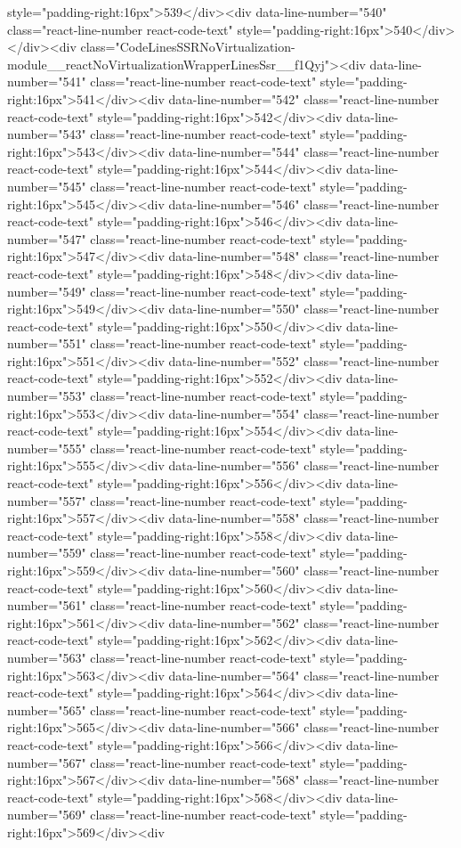 {{{{{{{style="padding-right:16px">539</div><div data-line-number="540" class="react-line-number react-code-text" style="padding-right:16px">540</div></div><div class="CodeLinesSSRNoVirtualization-module__reactNoVirtualizationWrapperLinesSsr__f1Qyj"><div data-line-number="541" class="react-line-number react-code-text" style="padding-right:16px">541</div><div data-line-number="542" class="react-line-number react-code-text" style="padding-right:16px">542</div><div data-line-number="543" class="react-line-number react-code-text" style="padding-right:16px">543</div><div data-line-number="544" class="react-line-number react-code-text" style="padding-right:16px">544</div><div data-line-number="545" class="react-line-number react-code-text" style="padding-right:16px">545</div><div data-line-number="546" class="react-line-number react-code-text" style="padding-right:16px">546</div><div data-line-number="547" class="react-line-number react-code-text" style="padding-right:16px">547</div><div data-line-number="548" class="react-line-number react-code-text" style="padding-right:16px">548</div><div data-line-number="549" class="react-line-number react-code-text" style="padding-right:16px">549</div><div data-line-number="550" class="react-line-number react-code-text" style="padding-right:16px">550</div><div data-line-number="551" class="react-line-number react-code-text" style="padding-right:16px">551</div><div data-line-number="552" class="react-line-number react-code-text" style="padding-right:16px">552</div><div data-line-number="553" class="react-line-number react-code-text" style="padding-right:16px">553</div><div data-line-number="554" class="react-line-number react-code-text" style="padding-right:16px">554</div><div data-line-number="555" class="react-line-number react-code-text" style="padding-right:16px">555</div><div data-line-number="556" class="react-line-number react-code-text" style="padding-right:16px">556</div><div data-line-number="557" class="react-line-number react-code-text" style="padding-right:16px">557</div><div data-line-number="558" class="react-line-number react-code-text" style="padding-right:16px">558</div><div data-line-number="559" class="react-line-number react-code-text" style="padding-right:16px">559</div><div data-line-number="560" class="react-line-number react-code-text" style="padding-right:16px">560</div><div data-line-number="561" class="react-line-number react-code-text" style="padding-right:16px">561</div><div data-line-number="562" class="react-line-number react-code-text" style="padding-right:16px">562</div><div data-line-number="563" class="react-line-number react-code-text" style="padding-right:16px">563</div><div data-line-number="564" class="react-line-number react-code-text" style="padding-right:16px">564</div><div data-line-number="565" class="react-line-number react-code-text" style="padding-right:16px">565</div><div data-line-number="566" class="react-line-number react-code-text" style="padding-right:16px">566</div><div data-line-number="567" class="react-line-number react-code-text" style="padding-right:16px">567</div><div data-line-number="568" class="react-line-number react-code-text" style="padding-right:16px">568</div><div data-line-number="569" class="react-line-number react-code-text" style="padding-right:16px">569</div><div }}}}}}}

